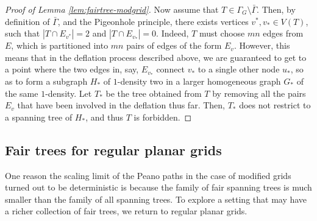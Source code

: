 \documentclass[preprint,12pt]{elsarticle}
\theoremstyle{definition}
\theoremstyle{remark}
\numberwithin{equation}{section}
\begin{document}
\begin{proof}[Proof of Lemma \ref{lem:fairtree-modgrid}]
Now assume that $T \in \Gamma_G\setminus \bar{\Gamma}$. Then, by definition of $\bar{\Gamma}$, and the Pigeonhole principle, there exists vertices $v^*,v_*\in V(T)$, such that $|T\cap E_{v^*}|=2$ and $|T\cap E_{v_*}|=0$. Indeed, $T$ must choose $mn$ edges from $E$, which is partitioned into $mn$ pairs of edges of the form $E_v$. 
 However, this means that in the deflation process described above, we are guaranteed to get to a point where the two edges in, say, $E_{v_*}$ connect $v_*$ to a single other node $u_*$, so as to form a subgraph $H_*$ of $1$-density two in a larger homogeneous graph $G_*$ of the same $1$-density. Let $T_*$ be the tree obtained from $T$ by removing all the pairs $E_v$ that have been involved in the deflation thus far. Then, $T_*$ does not restrict to a spanning tree of $H_*$, and thus $T$ is forbidden. 
\end{proof}





\subsection{Fair trees for regular planar grids}\label{sec:grids}

One reason the scaling limit of the Peano paths in the case of modified grids turned out to be deterministic is because the family of fair spanning trees is much smaller than the family of all spanning trees. 
To explore a setting that may have a richer collection of fair trees, we return to regular planar grids.
\end{document}
